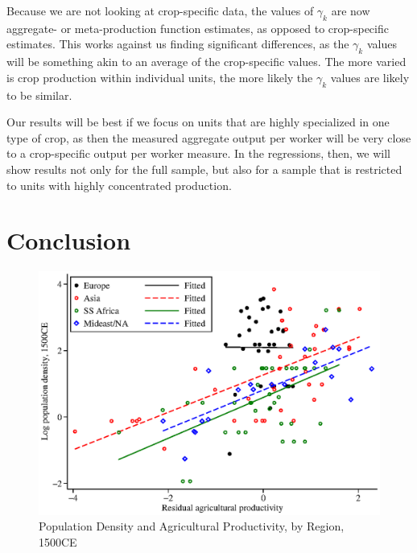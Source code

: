 \documentclass[10pt]{article}
\begin{document}
Because we are not looking at crop-specific data, the values of $\gamma_k$ are now aggregate- or meta-production function estimates, as opposed to crop-specific estimates. This works against us finding significant differences, as the $\gamma_k$ values will be something akin to an average of the crop-specific values. The more varied is crop production within individual units, the more likely the $\gamma_k$ values are likely to be similar.

Our results will be best if we focus on units that are highly specialized in one type of crop, as then the measured aggregate output per worker will be very close to a crop-specific output per worker measure. In the regressions, then, we will show results not only for the full sample, but also for a sample that is restricted to units with highly concentrated production. 

\section{Conclusion}


\clearpage




\clearpage

\begin{figure}[htbp]
\begin{center}
\caption{Population Density and Agricultural Productivity, by Region, 1500CE}
\label{FIG_ag_regions}
\includegraphics[width=1.0\textwidth]{fig_ag_regions.eps}
\end{center}
\end{figure}
\end{document}
